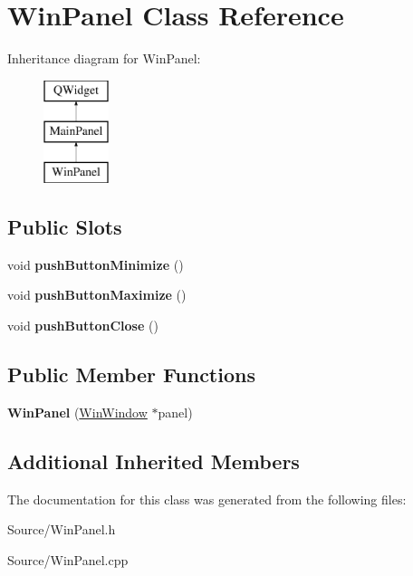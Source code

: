 \hypertarget{class_win_panel}{}\section{Win\+Panel Class Reference}
\label{class_win_panel}
Inheritance diagram for Win\+Panel\+:\begin{figure}[H]
\begin{center}
\leavevmode
\includegraphics[height=3.000000cm]{class_win_panel}
\end{center}
\end{figure}
\subsection*{Public Slots}
\begin{DoxyCompactItemize}
\item 
\hypertarget{class_win_panel_a771a0fe747c4f888fd9cfddd9d977858}{}void {\bfseries push\+Button\+Minimize} ()\label{class_win_panel_a771a0fe747c4f888fd9cfddd9d977858}

\item 
\hypertarget{class_win_panel_a66688e1f77a95659388806072db39697}{}void {\bfseries push\+Button\+Maximize} ()\label{class_win_panel_a66688e1f77a95659388806072db39697}

\item 
\hypertarget{class_win_panel_ad48b22a2b7c06e676c4551517f18c5ea}{}void {\bfseries push\+Button\+Close} ()\label{class_win_panel_ad48b22a2b7c06e676c4551517f18c5ea}

\end{DoxyCompactItemize}
\subsection*{Public Member Functions}
\begin{DoxyCompactItemize}
\item 
\hypertarget{class_win_panel_a8f9d63debe586788e80decb26f99b845}{}{\bfseries Win\+Panel} (\hyperlink{class_win_window}{Win\+Window} $\ast$panel)\label{class_win_panel_a8f9d63debe586788e80decb26f99b845}

\end{DoxyCompactItemize}
\subsection*{Additional Inherited Members}


The documentation for this class was generated from the following files\+:\begin{DoxyCompactItemize}
\item 
Source/Win\+Panel.\+h\item 
Source/Win\+Panel.\+cpp\end{DoxyCompactItemize}
